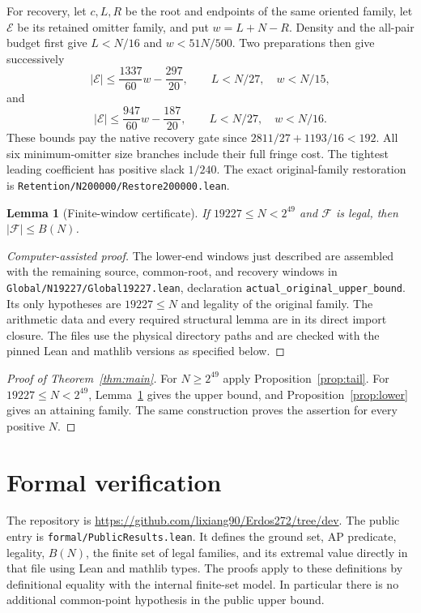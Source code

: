 \documentclass[11pt,a4paper]{article}
\newtheorem{lemma}[theorem]{Lemma}
\theoremstyle{definition}\newtheorem{definition}[theorem]{Definition}
\newcommand{\F}{\mathcal F}
\newcommand{\repo}{\url{https://github.com/lixiang90/Erdos272/tree/dev}}
\newcommand{\code}[1]{{\small\nolinkurl{#1}}}
\begin{document}
For recovery, let $c,L,R$ be the root and endpoints of the same oriented
family, let $\mathcal E$ be its retained omitter family, and put
$w=L+N-R$. Density and the all-pair budget first give
$L<N/16$ and $w<51N/500$. Two preparations then give successively
\[
 |\mathcal E|\le\frac{1337}{60}w-\frac{297}{20},
 \qquad L<N/27,\quad w<N/15,
\]
and
\[
 |\mathcal E|\le\frac{947}{60}w-\frac{187}{20},
 \qquad L<N/27,\quad w<N/16.
\]
These bounds pay the native recovery gate since
$2811/27+1193/16<192$. All six minimum-omitter size branches include
their full fringe cost. The tightest leading coefficient has positive
slack $1/240$. The exact original-family restoration is
\code{Retention/N200000/Restore200000.lean}.

\begin{lemma}[Finite-window certificate]\label{lem:finite}
If $19227\le N<2^{49}$ and $\F$ is legal, then $|\F|\le B(N)$.
\end{lemma}
\begin{proof}[Computer-assisted proof]
The lower-end windows just described are assembled with the remaining
source, common-root, and recovery windows in
\code{Global/N19227/Global19227.lean}, declaration
\code{actual_original_upper_bound}. Its only hypotheses are
$19227\le N$ and legality of the original family. The arithmetic data
and every required structural lemma are in its direct import closure.
The files use the physical directory paths and are checked with the
pinned Lean and mathlib versions as specified below.
\end{proof}

\begin{proof}[Proof of Theorem~\ref{thm:main}]
For $N\ge2^{49}$ apply Proposition~\ref{prop:tail}. For
$19227\le N<2^{49}$, Lemma~\ref{lem:finite} gives the upper bound,
and Proposition~\ref{prop:lower} gives an attaining family. The same
construction proves the assertion for every positive $N$.
\end{proof}

\section{Formal verification}\label{sec:verification}
The repository is \repo. The public entry is
\code{formal/PublicResults.lean}. It defines the ground set, AP predicate,
legality, $B(N)$, the finite set of legal families, and its extremal value
directly in that file using Lean and mathlib types. The proofs apply to
these definitions by definitional equality with the internal finite-set
model. In particular there is no additional common-point hypothesis in
the public upper bound.
\end{document}
